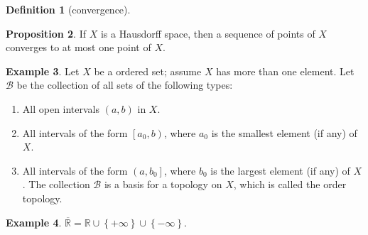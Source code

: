 \documentclass[12pt,a4paper]{book}
\newcommand{\bbrace}[1]{\left\{ #1 \right\} }
\newcommand{\bb}[1]{\mathbb{#1}}
\newenvironment{enu}{\begin{enumerate}[(1)]}{\end{enumerate}}
\theoremstyle{definition}
\newtheorem{defn}{Definition}[section]
\newtheorem{prop}[defn]{Proposition}
\newtheorem{exam}[defn]{Example}
\begin{document}
\begin{defn}[convergence]

\end{defn}
\begin{prop}
    If $X$ is a Hausdorff space, then a sequence of points of $X$ converges to at most one point of $X$.
\end{prop}
\begin{exam}
    Let $X$ be a ordered set; assume $X$ has more than one element. Let $\mathcal{B}$ be the collection of all sets of the following types:
    \begin{enu}
        \item All open intervals $(a, b)$ in $X$.
        \item All intervals of the form $\left[a_0, b\right)$, where $a_0$ is the smallest element (if any) of $X$.
                    \item  All intervals of the form $\left(a, b_0\right]$, where $b_0$ is the largest element (if any) of $X$. The collection $\mathcal{B}$ is a basis for a topology on $X$, which is called the order topology.
    \end{enu}
\end{exam}
\begin{exam}
    $\overline{\bb{R}}=\bb{R}\cup\bbrace{+\infty}\cup\bbrace{-\infty}$.
\end{exam}
\end{document}
